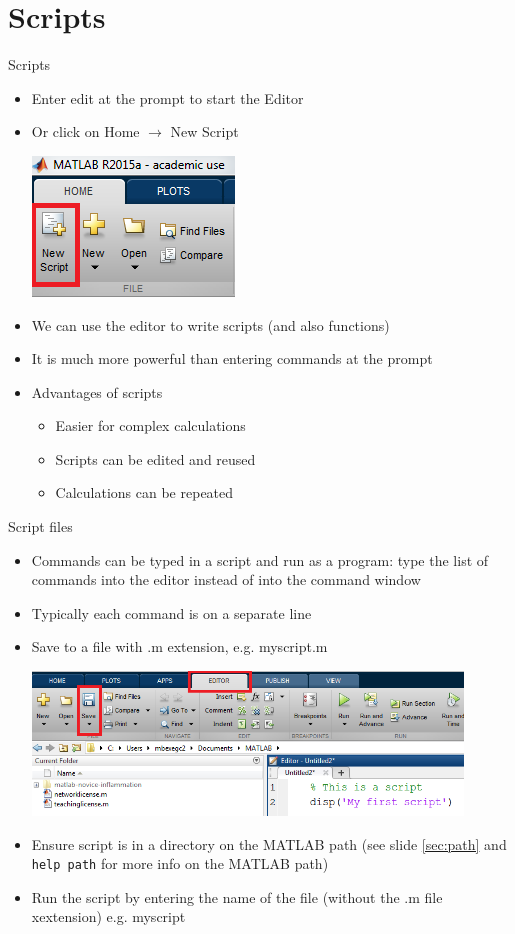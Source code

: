 \documentclass{beamer}
\begin{document}
\section{Scripts}
\begin{frame}{Scripts}
	\begin{itemize}
		\item Enter edit at the prompt to start the Editor
		\item Or click on Home $\rightarrow$ New Script
		
		\includegraphics[scale=0.7]{new_script}	
		
		\item We can use the editor to write scripts (and also functions)
		\item It is much more powerful than entering commands at the prompt
		\item Advantages of scripts
			\begin{itemize}
				\item Easier for complex calculations
				\item Scripts can be edited and reused
				\item Calculations can be repeated
			\end{itemize}
	\end{itemize}
\end{frame}

\begin{frame}{Script files}
	\begin{itemize}
		\item Commands can be typed in a script and run as a program: type the list of commands into the editor instead of into the command window
		\item Typically each command is on a separate line
		\item Save to a file with .m extension, e.g. myscript.m
		
		\includegraphics[width=0.9\textwidth]{save_script}
		\item Ensure script is in a directory on the MATLAB path (see slide \ref{sec:path} and \texttt{help path} for more info on the MATLAB path)
		\item Run the script by entering the name of the file (without the .m file xextension) e.g. myscript
	\end{itemize}
\end{frame}
\end{document}

